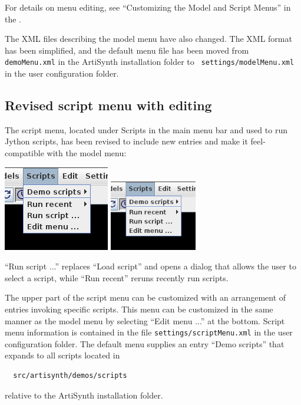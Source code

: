 \documentclass{article}
\begin{document}
For details on menu editing, see ``Customizing the Model
and Script Menus'' in the .

The XML files describing the model menu have also changed. The XML
format has been simplified, and the default menu file has been moved
from {\tt demoMenu.xml} in the ArtiSynth installation folder to {\tt
settings/modelMenu.xml} in the user configuration folder.

\subsection*{Revised script menu with editing}

The script menu, located under {\sf Scripts} in the main menu bar and
used to run Jython scripts, has been revised to include new entries
and make it feel-compatible with the model menu:

\begin{center}
\iflatexml
\includegraphics[]{images/scriptMenu}
\else
\includegraphics[width=1.5in]{images/scriptMenu}
\fi
\end{center}

{\sf ``Run script ...''} replaces {\sf ``Load script''} and opens a
dialog that allows the user to select a script, while {\sf ``Run
recent''} reruns recently run scripts.

The upper part of the script menu can be customized with an
arrangement of entries invoking specific scripts. This menu can be
customized in the same manner as the model menu by selecting {\sf
``Edit menu ...''} at the bottom. Script menu
information is contained in the file {\tt settings/scriptMenu.xml} in
the user configuration folder. The default menu supplies an entry
{\sf ``Demo scripts''} that expands to all scripts located in
%
\begin{verbatim}
  src/artisynth/demos/scripts
\end{verbatim}
%
relative to the ArtiSynth installation folder.
\end{document}
